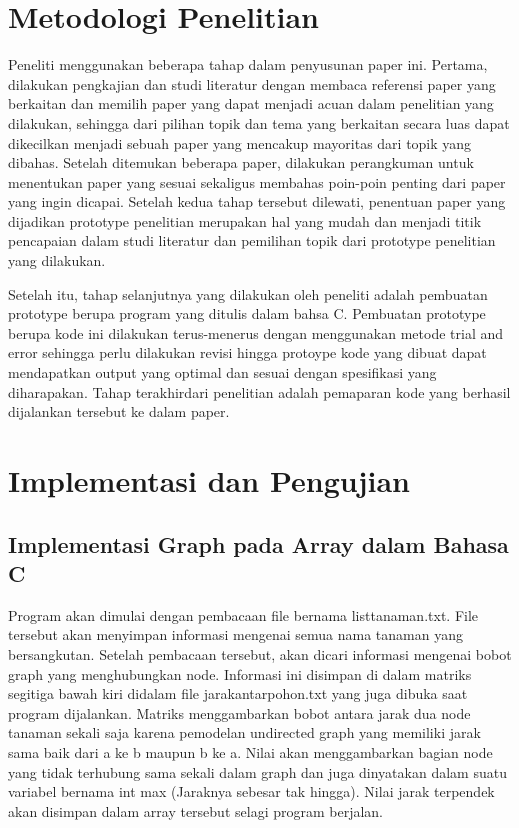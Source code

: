 \documentclass[10pt, conference]{IEEEtran}
\begin{document}
\section{Metodologi Penelitian}
Peneliti menggunakan beberapa tahap dalam penyusunan paper ini. Pertama, dilakukan pengkajian dan studi literatur dengan membaca referensi paper yang berkaitan dan memilih paper yang dapat menjadi acuan dalam penelitian yang dilakukan, sehingga dari pilihan topik dan tema yang berkaitan secara luas dapat dikecilkan menjadi sebuah paper yang mencakup mayoritas dari topik yang dibahas. Setelah ditemukan beberapa paper, dilakukan perangkuman untuk menentukan paper yang sesuai sekaligus membahas poin-poin penting dari paper yang ingin dicapai. Setelah kedua tahap tersebut dilewati, penentuan paper yang dijadikan prototype penelitian merupakan hal yang mudah dan menjadi titik pencapaian dalam studi literatur dan pemilihan topik dari prototype penelitian yang dilakukan.

Setelah itu, tahap selanjutnya yang dilakukan oleh peneliti adalah pembuatan prototype berupa program yang ditulis dalam bahsa C. Pembuatan prototype berupa kode ini dilakukan terus-menerus dengan menggunakan metode trial and error sehingga perlu dilakukan revisi hingga protoype kode yang dibuat dapat mendapatkan output yang optimal dan sesuai dengan spesifikasi yang diharapakan. Tahap terakhirdari penelitian adalah  pemaparan kode yang berhasil dijalankan tersebut ke dalam paper. 

\section{Implementasi dan Pengujian}
\subsection{Implementasi Graph pada Array dalam Bahasa C}
Program akan dimulai dengan pembacaan file bernama listtanaman.txt. File tersebut akan menyimpan informasi mengenai semua nama tanaman yang bersangkutan. Setelah pembacaan tersebut, akan dicari informasi mengenai bobot graph yang menghubungkan node. Informasi ini disimpan di dalam matriks segitiga bawah kiri didalam file jarakantarpohon.txt yang juga dibuka saat program dijalankan. Matriks menggambarkan bobot antara jarak dua node tanaman sekali saja karena pemodelan undirected graph yang memiliki jarak sama baik dari a ke b maupun b ke a. Nilai akan menggambarkan bagian node yang tidak terhubung sama sekali dalam graph dan juga dinyatakan dalam suatu variabel bernama int max
(Jaraknya sebesar tak hingga). Nilai jarak terpendek akan disimpan dalam array tersebut selagi program berjalan. 
\end{document}
